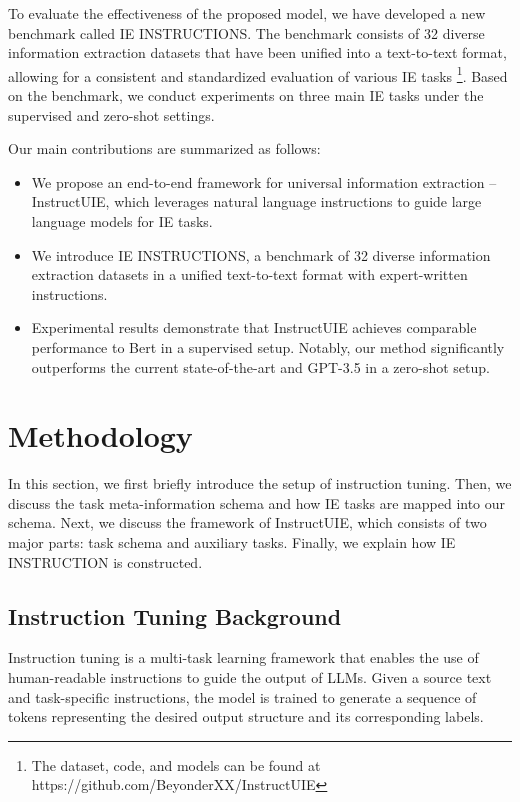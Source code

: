 To evaluate the effectiveness of the proposed model, we have developed a new benchmark called IE INSTRUCTIONS. The benchmark consists of 32 diverse information extraction datasets that have been unified into a text-to-text format, allowing for a consistent and standardized evaluation of various IE tasks \footnote{The dataset, code, and models can be found at 
https://github.com/BeyonderXX/InstructUIE}. 
Based on the benchmark, we conduct experiments on three main IE tasks under the supervised and zero-shot settings. 

Our main contributions are summarized as follows:

\begin{itemize}[leftmargin=*, align=left]
    \item We propose an end-to-end framework for universal information extraction – InstructUIE, which leverages natural language instructions to guide large language models for IE tasks.
    \item We introduce IE INSTRUCTIONS, a benchmark of 32 diverse information extraction datasets in a unified text-to-text format with expert-written instructions. 
    \item Experimental results demonstrate that InstructUIE achieves comparable performance to Bert in a supervised setup. Notably, our method significantly outperforms the current state-of-the-art and GPT-3.5 in a zero-shot setup.
\end{itemize}

\section{Methodology}
In this section, we first briefly introduce the setup of instruction tuning. 
Then, we discuss the task meta-information schema and how IE tasks are mapped into our schema. 
Next, we discuss the framework of InstructUIE, which consists of two major parts: task schema and auxiliary tasks.
Finally, we explain how IE INSTRUCTION is constructed.

\subsection{Instruction Tuning Background}
Instruction tuning is a multi-task learning framework that enables the use of human-readable instructions to guide the output of LLMs. Given a source text and task-specific instructions, the model is trained to generate a sequence of tokens representing the desired output structure and its corresponding labels. 


